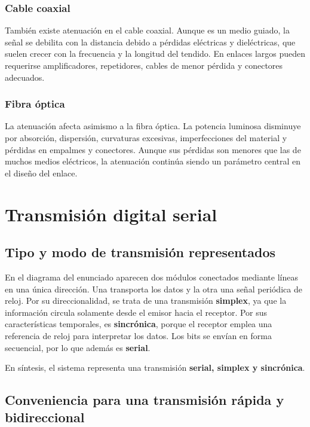 ﻿\documentclass[12pt,a4paper]{article}
\begin{document}
\subsubsection{Cable coaxial}

También existe atenuación en el cable coaxial. Aunque es un medio guiado, la
señal se debilita con la distancia debido a pérdidas eléctricas y dieléctricas,
que suelen crecer con la frecuencia y la longitud del tendido. En enlaces largos
pueden requerirse amplificadores, repetidores, cables de menor pérdida y
conectores adecuados.

\subsubsection{Fibra óptica}

La atenuación afecta asimismo a la fibra óptica. La potencia luminosa disminuye
por absorción, dispersión, curvaturas excesivas, imperfecciones del material y
pérdidas en empalmes y conectores. Aunque sus pérdidas son menores que las de
muchos medios eléctricos, la atenuación continúa siendo un parámetro central en
el diseño del enlace.

\section{Transmisión digital serial}

\subsection{Tipo y modo de transmisión representados}

En el diagrama del enunciado aparecen dos módulos conectados mediante líneas en
una única dirección. Una transporta los datos y la otra una señal periódica de
reloj. Por su direccionalidad, se trata de una transmisión \textbf{simplex}, ya
que la información circula solamente desde el emisor hacia el receptor. Por sus
características temporales, es \textbf{sincrónica}, porque el receptor emplea
una referencia de reloj para interpretar los datos. Los bits se envían en forma
secuencial, por lo que además es \textbf{serial}.

En síntesis, el sistema representa una transmisión
\textbf{serial, simplex y sincrónica}.

\subsection{Conveniencia para una transmisión rápida y bidireccional}
\end{document}
